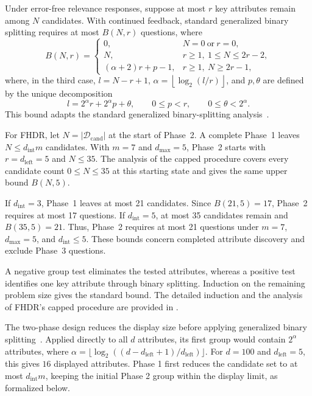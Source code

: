 \begin{theorem}\label{theorem_q}
    Under error-free relevance responses, suppose at most $r$ key attributes remain among $N$ candidates. With continued feedback, standard generalized binary splitting requires at most $B(N,r)$ questions, where
    \[
    B(N,r)=\left\{\begin{array}{ll}
    0, & N=0\ \text{or}\ r=0,\\[2pt]
    N, & r\geq1,\ 1\leq N\leq 2r-2,\\[2pt]
    (\alpha+2)r+p-1, & r\geq1,\ N\geq 2r-1,
    \end{array}\right.
    \]
    where, in the third case, $l=N-r+1$, $\alpha=\left\lfloor\log_2(l/r)\right\rfloor$, and $p,\theta$ are defined by the unique decomposition
    \[
    l=2^\alpha r+2^\alpha p+\theta,\qquad 0\leq p<r,\qquad 0\leq\theta<2^\alpha.
    \]
    This bound adapts the standard generalized binary-splitting analysis~\cite{hwang1972method,Du1993CombinatorialGT}.
\end{theorem}

For FHDR, let $N=|\mathcal{D}_\text{cand}|$ at the start of Phase~2. A complete Phase~1 leaves $N\leq d_\text{int}m$ candidates. With $m=7$ and $d_\text{max}=5$, Phase~2 starts with $r=d_\text{left}=5$ and $N\leq35$. The analysis of the capped procedure covers every candidate count $0\leq N\leq35$ at this starting state and gives the same upper bound $B(N,5)$.

\begin{example}
If $d_\text{int}=3$, Phase~1 leaves at most 21 candidates. Since $B(21,5)=17$, Phase~2 requires at most 17 questions. If $d_\text{int}=5$, at most 35 candidates remain and $B(35,5)=21$. Thus, Phase~2 requires at most 21 questions under $m=7$, $d_\text{max}=5$, and $d_\text{int}\leq5$. These bounds concern completed attribute discovery and exclude Phase~3 questions.
\end{example}

A negative group test eliminates the tested attributes, whereas a positive test identifies one key attribute through binary splitting. Induction on the remaining problem size gives the standard bound. The detailed induction and the analysis of FHDR's capped procedure are provided in \iftoggle{TechnicalReport}{Section~\ref{appen:proof} of the \technicalreport}{Appendix~\ref{appen:proof}}.

The two-phase design reduces the display size before applying generalized binary splitting~\cite{WGT}. Applied directly to all $d$ attributes, its first group would contain $2^\alpha$ attributes, where $\alpha=\lfloor\log_2((d-d_\text{left}+1)/d_\text{left})\rfloor$. For $d=100$ and $d_\text{left}=5$, this gives $16$ displayed attributes. Phase 1 first reduces the candidate set to at most $d_\text{int}m$, keeping the initial Phase 2 group within the display limit, as formalized below.


